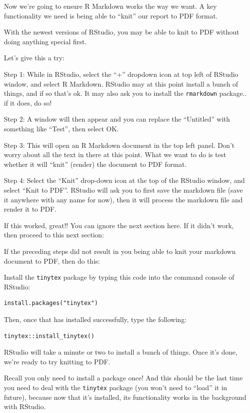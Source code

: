 \documentclass[
]{book}
\begin{document}
Now we're going to ensure R Markdown works the way we want. A key functionality we need is being able to ``knit'' our report to PDF format.

With the newest versions of RStudio, you may be able to knit to PDF without doing anything special first.

Let's give this a try:

Step 1: While in RStudio, select the ``+'' dropdown icon at top left of RStudio window, and select R Markdown. RStudio may at this point install a bunch of things, and if so that's ok. It may also ask you to install the \texttt{rmarkdown} package.. if it does, do so!

Step 2: A window will then appear and you can replace the ``Untitled'' with something like ``Test'', then select OK.

Step 3: This will open an R Markdown document in the top left panel. Don't worry about all the text in there at this point. What we want to do is test whether it will ``knit'' (render) the document to PDF format.

Step 4: Select the ``Knit'' drop-down icon at the top of the RStudio window, and select ``Knit to PDF''. RStudio will ask you to first save the markdown file (save it anywhere with any name for now), then it will process the markdown file and render it to PDF.

If this worked, great!! You can ignore the next section here. If it didn't work, then proceed to this next section:

If the preceding steps did not result in you being able to knit your markdown document to PDF, then do this:

Install the \texttt{tinytex} package by typing this code into the command console of RStudio:

\begin{verbatim}
install.packages("tinytex")
\end{verbatim}

Then, once that has installed successfully, type the following:

\begin{verbatim}
tinytex::install_tinytex()
\end{verbatim}

RStudio will take a minute or two to install a bunch of things. Once it's done, we're ready to try knitting to PDF.

Recall you only need to install a package once! And this should be the last time you need to deal with the \texttt{tinytex} package (you won't need to ``load'' it in future), because now that it's installed, its functionality works in the background with RStudio.
\end{document}
